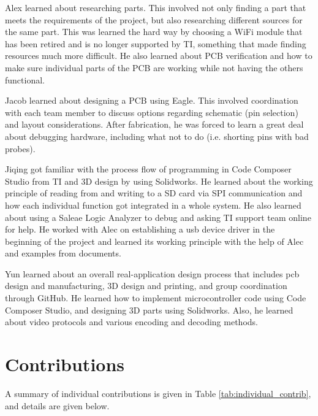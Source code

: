 \documentclass[12pt]{article}
\begin{document}
Alex learned about researching parts. This involved not only finding a part
that meets the requirements of the project, but also researching different
sources for the same part. This was learned the hard way by choosing a WiFi
module that has been retired and is no longer supported by TI, something that
made finding resources much more difficult. He also learned about PCB
verification and how to make sure individual parts of the PCB are working while
not having the others functional. 

Jacob learned about designing a PCB using Eagle. This involved coordination
with each team member to discuss options regarding schematic (pin selection)
and layout considerations. After fabrication, he was forced to learn a great
deal about debugging hardware, including what not to do (i.e. shorting pins
with bad probes).

Jiqing got familiar with the process flow of programming in Code Composer
Studio from TI and 3D design by using Solidworks. He learned about the working
principle of reading from and writing to a SD card via SPI communication and
how each individual function got integrated in a whole system. He also learned
about using a Saleae Logic Analyzer to debug and asking TI support team online
for help. He worked with Alec on establishing a \gls{usb} device driver in the
beginning of the project and learned its working principle with the help of
Alec and examples from documents.

Yun learned about an overall real-application design process that includes
\gls{pcb} design and manufacturing, 3D design and printing, and group
coordination through GitHub. He learned how to implement microcontroller code
using Code Composer Studio, and designing 3D parts using Solidworks. Also, he
learned about video protocols and various encoding and decoding methods.

\section{Contributions}
A summary of individual contributions is given in Table
\ref{tab:individual_contrib}, and details are given below.
\end{document}
